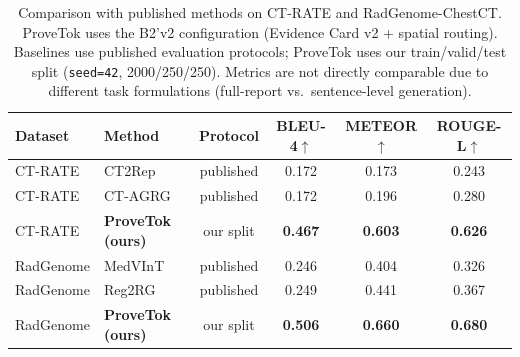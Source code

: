\begin{table}[t]
\centering
\caption{Comparison with published methods on CT-RATE and RadGenome-ChestCT.
ProveTok uses the B2'v2 configuration (Evidence Card v2 + spatial routing).
Baselines use published evaluation protocols; ProveTok uses our train/valid/test split
(\texttt{seed=42}, 2000/250/250). Metrics are not directly comparable due to
different task formulations (full-report vs.\ sentence-level generation).}
\label{tab:main}
\small
\begin{tabular}{@{}llc ccc@{}}
\toprule
\textbf{Dataset} & \textbf{Method} & \textbf{Protocol}
  & \textbf{BLEU-4}$\uparrow$ & \textbf{METEOR}$\uparrow$ & \textbf{ROUGE-L}$\uparrow$ \\
\midrule
CT-RATE & CT2Rep      & published & 0.172 & 0.173 & 0.243 \\
CT-RATE & CT-AGRG     & published & 0.172 & 0.196 & 0.280 \\
CT-RATE & \textbf{ProveTok (ours)} & our split & \textbf{0.467} & \textbf{0.603} & \textbf{0.626} \\
\midrule
RadGenome & MedVInT   & published & 0.246 & 0.404 & 0.326 \\
RadGenome & Reg2RG    & published & 0.249 & 0.441 & 0.367 \\
RadGenome & \textbf{ProveTok (ours)} & our split & \textbf{0.506} & \textbf{0.660} & \textbf{0.680} \\
\bottomrule
\end{tabular}
\end{table}
